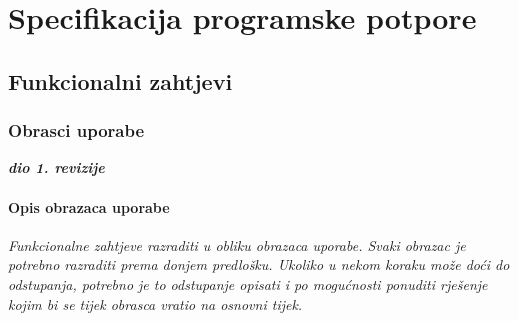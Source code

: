 \chapter{Specifikacija programske potpore}
	
	\section{Funkcionalni zahtjevi}
	
	
	
	\eject
	
	\subsection{Obrasci uporabe}
	
	\textbf{\textit{dio 1. revizije}}
	
	\subsubsection{Opis obrazaca uporabe}
	\textit{Funkcionalne zahtjeve razraditi u obliku obrazaca uporabe. Svaki obrazac je potrebno razraditi prema donjem predlošku. Ukoliko u nekom koraku može doći do odstupanja, potrebno je to odstupanje opisati i po mogućnosti ponuditi rješenje kojim bi se tijek obrasca vratio na osnovni tijek.}\\
	
